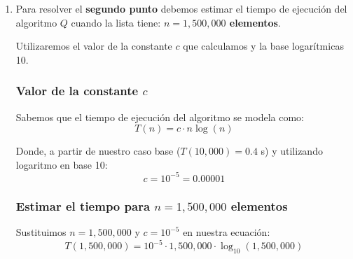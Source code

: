 \begin{enumerate}
    \subsubsection*{Estimar el tiempo para $n = 60,000$ elementos}
    Ahora que conocemos la constante $c$, evaluamos el tiempo de ejecución en $n = 60,000$.
    
    Sustituimos en la ecuación:
    $$T(60,000) = 10^{-5} \cdot 60,000 \cdot \log_{10}(60,000)$$
    $$T(60,000) = 0.6 \cdot \log_{10}(60,000)$$
    Calculamos $\log_{10}(60,000)$:
    $$\log_{10}(60,000) = \log_{10}(6 \cdot 10^4) = \log_{10}(6) + \log_{10}(10^4) \approx 0.77815 + 4 = 4.77815$$
    Multiplicamos:
    $$T(60,000) \approx 0.6 \cdot 4.77815 \approx \mathbf{2.867} \text{ \textbf{segundos}}$$
    
    
    \subsubsection*{Conclusión:}
    El tiempo estimado de ejecución para una lista de $60,000$ elementos es de aproximadamente \textbf{2.867 segundos} (o $2.87$ segundos si redondeamos a dos decimales).

    \vspace{0.4cm}
    
    \item 
    Para resolver el \textbf{segundo punto} debemos estimar el tiempo de ejecución del algoritmo $Q$ cuando la lista tiene: \textbf{$n = 1,500,000$ elementos}.
    
    Utilizaremos el valor de la constante $c$ que calculamos y la base logarítmicas 10.
    
    \subsubsection*{Valor de la constante $c$}
    
    Sabemos que el tiempo de ejecución del algoritmo se modela como:
    $$T(n) = c \cdot n \log(n)$$
    
    Donde, a partir de nuestro caso base ($T(10,000) = 0.4$ s) y utilizando logaritmo en base 10:
    $$c = 10^{-5} = 0.00001$$
    
    \subsubsection*{Estimar el tiempo para $n = 1,500,000$ elementos}
    Sustituimos $n = 1,500,000$ y $c = 10^{-5}$ en nuestra ecuación:
    $$T(1,500,000) = 10^{-5} \cdot 1,500,000 \cdot \log_{10}(1,500,000)$$
    

\end{enumerate}
